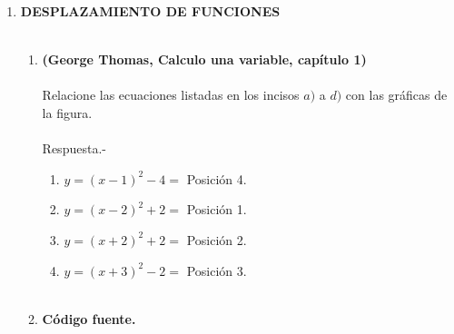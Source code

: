 \begin{enumerate}
\begin{enumerate}[\bfseries a)]
    \end{enumerate}

\newpage

\item \textbf{\large DESPLAZAMIENTO DE FUNCIONES}\\\\

    \begin{enumerate}[\bfseries a)]

	\item \textbf{(George Thomas, Calculo una variable, capítulo 1)}\\\\ 
	    Relacione las ecuaciones listadas en los incisos $a)$ a $d)$ con las gráficas de la figura.\\\\
		Respuesta.-\;
		\begin{enumerate}[\bfseries a)]

		    \item $y=(x-1)^2 - 4 = $ Posición 4.\\

		    \item $y=(x-2)^2 + 2 = $ Posición 1.\\

		    \item $y=(x+2)^2 + 2 = $ Posición 2.\\

		    \item $y=(x+3)^2 - 2 = $ Posición 3.\\\\
		\end{enumerate}

	\item \textbf{Código fuente.}\\ 
	    
	    
	    \vspace{.5cm}
	

\end{enumerate}
\end{enumerate}
